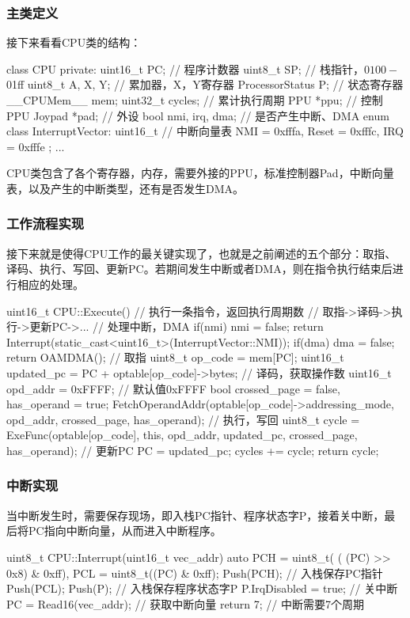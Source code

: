 \documentclass[a4paper]{ltxdoc}
\begin{document}
{\subsubsection{主类定义}
接下来看看CPU类的结构：
\begin{cppcode}
class CPU {
private:
	uint16_t PC; // 程序计数器
	uint8_t SP; // 栈指针，$0100-$01ff
	uint8_t A, X, Y; // 累加器，X，Y寄存器
	ProcessorStatus P; // 状态寄存器
	__CPUMem__ mem;
	uint32_t cycles; // 累计执行周期
	PPU *ppu; // 控制PPU
	Joypad *pad; // 外设
	bool nmi, irq, dma; // 是否产生中断、DMA
	enum class InterruptVector: uint16_t { // 中断向量表
		NMI = 0xfffa,
		Reset = 0xfffc,
		IRQ = 0xfffe
	};
	...
}
\end{cppcode}

CPU类包含了各个寄存器，内存，需要外接的PPU，标准控制器Pad，中断向量表，以及产生的中断类型，还有是否发生DMA。

\subsubsection{工作流程实现}
接下来就是使得CPU工作的最关键实现了，也就是之前阐述的五个部分：取指、译码、执行、写回、更新PC。若期间发生中断或者DMA，则在指令执行结束后进行相应的处理。
\begin{cppcode}
uint16_t CPU::Execute() { // 执行一条指令，返回执行周期数
	// 取指->译码->执行->更新PC->...
	// 处理中断，DMA
	if(nmi) { nmi = false; return Interrupt(static_cast<uint16_t>(InterruptVector::NMI)); }
	if(dma) { dma = false; return OAMDMA(); }
	// 取指
	uint8_t op_code = mem[PC];
	uint16_t updated_pc = PC + optable[op_code]->bytes;
	// 译码，获取操作数
	uint16_t opd_addr = 0xFFFF; // 默认值0xFFFF
	bool crossed_page = false, has_operand = true;
	FetchOperandAddr(optable[op_code]->addressing_mode, opd_addr, crossed_page, has_operand);
	// 执行，写回
	uint8_t cycle = ExeFunc(optable[op_code], this, opd_addr, updated_pc, crossed_page, has_operand);
	// 更新PC
	PC = updated_pc;
	cycles += cycle;
	return cycle;
}
\end{cppcode}
\subsubsection{中断实现}
当中断发生时，需要保存现场，即入栈PC指针、程序状态字P，接着关中断，最后将PC指向中断向量，从而进入中断程序。
\begin{cppcode}
uint8_t CPU::Interrupt(uint16_t vec_addr) {
	auto PCH = uint8_t( ( (PC) >> 0x8) & 0xff),
		 PCL = uint8_t((PC) & 0xff);
	Push(PCH); // 入栈保存PC指针
	Push(PCL);
	Push(P); // 入栈保存程序状态字P
	P.IrqDisabled = true; // 关中断
	PC = Read16(vec_addr); // 获取中断向量
	return 7; // 中断需要7个周期
}
\end{cppcode}

}
\end{document}
